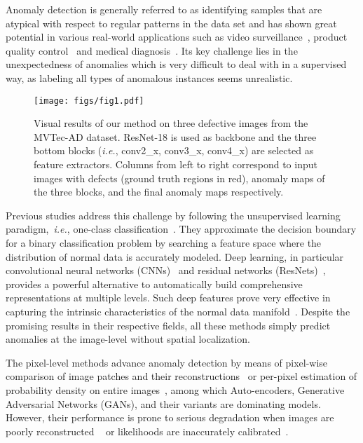 \documentclass[final]{cvpr}
\begin{document}


\label{sec1}

Anomaly detection is generally referred to as identifying samples that are atypical with respect to regular patterns in the data set and has shown great potential in various real-world applications such as video surveillance~\cite{Abati2019,Roitberg2018}, product quality control~\cite{Bergmann2019,Bergmann2020,Napoletano2018} and medical diagnosis~\cite{Schlegl2019,Schlegl2017,Vasilev2018}. Its key challenge lies in the unexpectedness of anomalies which is very difficult to deal with in a supervised way, as labeling all types of anomalous instances seems unrealistic. 

\begin{figure}
	\centering
	\texttt{[image: figs/fig1.pdf]}
	\caption{Visual results of our method on three defective images from the MVTec-AD dataset. ResNet-18 is used as backbone and the three bottom blocks (\textit{i.e.}, conv2\_x, conv3\_x, conv4\_x) are selected as feature extractors. Columns from left to right correspond to input images with defects (ground truth regions in red), anomaly maps of the three blocks, and the final anomaly maps respectively.}
	\label{fig1}
\end{figure}

Previous studies address this challenge by following the unsupervised learning paradigm,~\textit{i.e.}, one-class classification~\cite{Moya1993}. They approximate the decision boundary for a binary classification problem  by searching a feature space where the distribution of normal data is accurately modeled.
Deep learning, in particular convolutional neural networks (CNNs)~\cite{Lecun1998} and residual networks (ResNets)~\cite{He2016}, provides a powerful alternative to automatically build comprehensive representations at multiple levels. Such deep features prove very effective in capturing the intrinsic characteristics of the normal data manifold~\cite{An2015,Chalapathy2018,Masana2018,Ruff2018,Zhou2017}. 
Despite the promising results in their respective fields, all these methods simply predict anomalies at the image-level without spatial localization.


The pixel-level methods advance anomaly detection by means of pixel-wise comparison of image patches and their reconstructions~\cite{Baur2018,Schlegl2019,Schlegl2017} or per-pixel estimation of probability density on entire images~\cite{Abati2019,Seebock2016}, among which Auto-encoders, Generative Adversarial Networks (GANs), and their variants are dominating models. However, their performance is prone to serious degradation when images are poorly reconstructed ~\cite{Bergmann2019b} or likelihoods are inaccurately calibrated~\cite{Nalisnick2019}.
\end{document}
